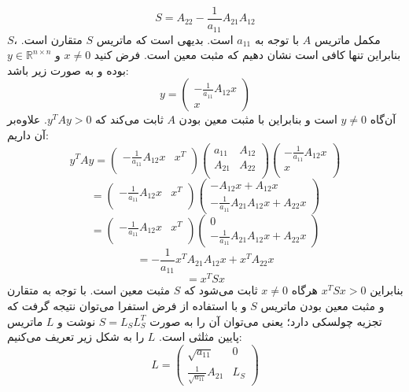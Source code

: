 \begin{itemize}
	 $$S = A_{22} - \frac{1}{a_{11}}A_{21}A_{12}$$ 
	 $S$، مکمل  ماتریس $A$ با توجه به $a_{11}$ است. 
	 بدیهی است که ماتریس $S$ متقارن است. بنابراین تنها کافی است نشان دهیم که مثبت معین است. فرض کنید $x \neq 0$ و 
	 	 $y \in \mathbb{R}^{n \times n}$ 
	 بوده و به صورت زیر باشد:
	 $$ y = 
	 \begin{pmatrix}
	 -\frac{1}{a_{11}}A_{12}x\\
	 x
	 \end{pmatrix}$$
	 آن‌گاه $y \neq 0$ است و بنابراین با مثبت معین بودن $A$ ثابت می‌کند که $y^TAy > 0$. علاوه‌بر آن داریم:
	 $$y^TAy = 
	 \begin{pmatrix}
	 -\frac{1}{a_{11}}A_{12}x & x^T \\
	 \end{pmatrix}
	 \begin{pmatrix}
	 a_{11} & A_{12} \\
	 A_{21} & A_{22}\\
	 \end{pmatrix}
	 \begin{pmatrix}
	 -\frac{1}{a_{11}}A_{12}x \\
	 x\\
	 \end{pmatrix}
	 $$
	 $$ =
	 \begin{pmatrix}
	 -\frac{1}{a_{11}}A_{12}x & x^T \\
	 \end{pmatrix}
	 \begin{pmatrix}
	 -A_{12}x + A_{12}x\\
	 -\frac{1}{a_{11}}A_{21}A_{12}x + A_{22}x
	 \end{pmatrix}
	 $$
	 $$ = 
	 \begin{pmatrix}
	 -\frac{1}{a_{11}}A_{12}x & x^T \\
	 \end{pmatrix}
	  \begin{pmatrix}
	 0\\
	 -\frac{1}{a_{11}}A_{21}A_{12}x + A_{22}x
	 \end{pmatrix}
	 $$
	 $$ = 
	 - \frac{1}{a_{11}}x^TA_{21}A_{12}x + x^TA_{22}x
	 $$
	 $$= x^TSx$$
	 بنابراین $x^TSx > 0$ هرگاه $x \neq 0$  ثابت می‌شود که $S$ مثبت معین است. با توجه به متقارن و مثبت معین بودن ماتریس $S$ و با استفاده از فرض استفرا می‌توان نتیجه گرفت که تجزیه چولسکی دارد؛ یعنی می‌توان آن را به صورت $S = L_SL_S^T$ نوشت و $L$ ماتریس پایین مثلثی است.
	 $L$ را به شکل زیر تعریف می‌کنیم:
	 $$L = 
	 \begin{pmatrix}
	 \sqrt{a_{11}} & 0 \\
	 \frac{1}{\sqrt{a_{11}}}A_{21} & L_S

\end{pmatrix}$$
\end{itemize}
